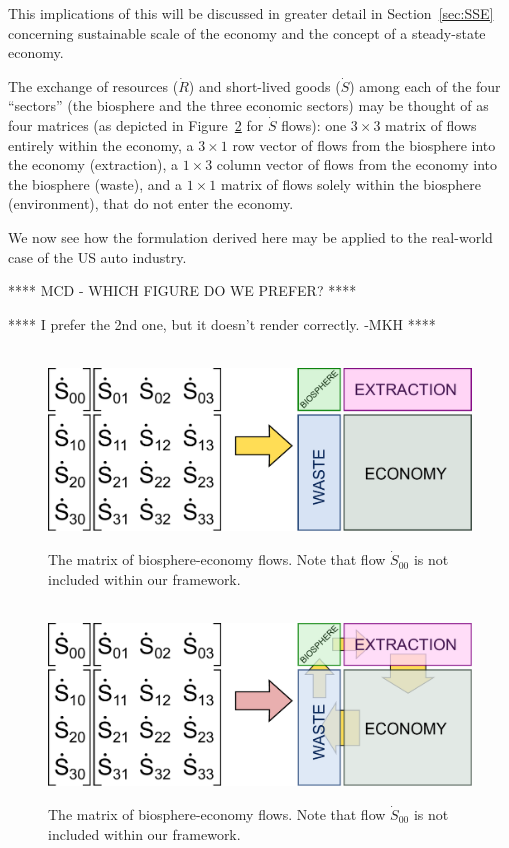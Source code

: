 \noindent{}This implications of this 
will be discussed in greater detail
in Section~\ref{sec:SSE} concerning 
sustainable scale of the economy and
the concept of a steady-state economy.

The exchange of resources ($\dot{R}$) and 
short-lived goods ($\dot{S}$) among
each of the four ``sectors''
(the biosphere and 
the three economic sectors) 
may be thought of as four matrices 
(as depicted in Figure~\ref{fig:C_mat_matrix} 
for $\dot{S}$ flows): 
one $3\times3$ matrix of flows 
entirely within the economy, 
a $3\times1$ row vector of flows from the 
biosphere into the economy (extraction), 
a $1\times3$ column vector of flows from the economy 
into the biosphere (waste), 
and a $1\times1$ matrix of flows 
solely within the biosphere (environment), 
that do not enter the economy.

We now see how the formulation derived here may be
applied to the real-world case of the US auto industry.

**** MCD - WHICH FIGURE DO WE PREFER? ****

**** I prefer the 2nd one, but it doesn't render correctly. -MKH ****

\begin{figure}[!ht]
\centering\
\includegraphics[width=0.8\linewidth]{Part_1/Chapter_Materials/images/Matrix.pdf}
\caption[The matrix of biosphere-economy flows]{The matrix of biosphere-economy flows. 
				Note that flow $\dot{S}_{00}$ is not included within our framework.}
\label{fig:C_mat_matrix_0}
\end{figure}

\begin{figure}[!ht]
\centering\
\includegraphics[width=0.8\linewidth]{Part_1/Chapter_Materials/images/Matrix_v2.pdf}
\caption[The matrix of biosphere-economy flows]{The matrix of biosphere-economy flows. 
				Note that flow $\dot{S}_{00}$ is not included within our framework.}
\label{fig:C_mat_matrix}
\end{figure}


